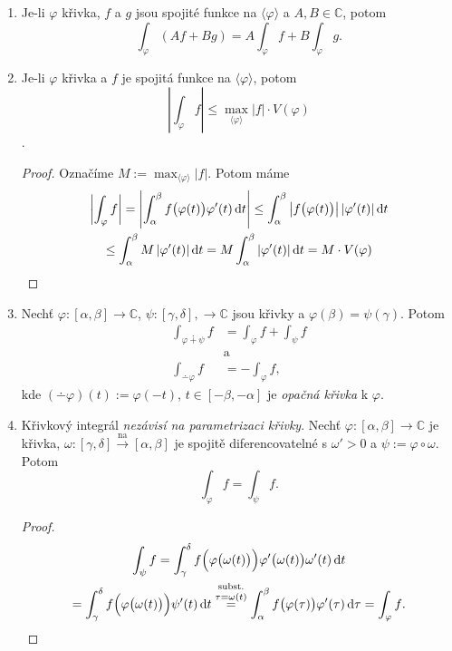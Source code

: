 \begin{propertiesBasic}
\mbox{}
\vspace{-2em}
\begin{enumerate}
    \item Je-li $\varphi$ křivka, $f$ a $g$ jsou spojité funkce na $\langle\varphi\rangle$ a $A,B \in \mathbb{C}$, potom $$\int_\varphi (Af+Bg)=A\int_\varphi f+B\int_\varphi g.$$
    \item Je-li $\varphi$ křivka a $f$ je spojitá funkce na $\langle\varphi\rangle$, potom $$\left|\int_\varphi f\right|\leq\max_{\langle\varphi\rangle}|f|\cdot V(\varphi)$$.
    \begin{proof}
     Označíme $M:=\max_{\langle\varphi\rangle}|f|$. Potom máme
     \begin{multline*}
     \left|\int_\varphi f\right|=
     \left| \int_\alpha^\beta f\bigl(\varphi(t)\bigr) \varphi'(t) \mathop{}\!\mathrm{d} t \right|
     \leq\int_\alpha^\beta\left|f\bigl(\varphi(t)\bigr)\right|\left|\varphi'(t)\right|\mathop{}\!\mathrm{d} t\\
     \leq\int_\alpha^\beta M\left|\varphi'(t)\right|\mathop{}\!\mathrm{d} t =M\int_\alpha^\beta \left|\varphi'(t)\right|\mathop{}\!\mathrm{d} t
     = M\cdot V(\varphi)
     \end{multline*}
    \end{proof}
    \item Nechť %
    $\varphi:[\alpha,\beta]\rightarrow\mathbb{C}$, $\psi:[\gamma,\delta],\rightarrow\mathbb{C}$ jsou křivky a $\varphi(\beta)=\psi(\gamma)$. Potom 
    \begin{align*}
        \int_{\varphi\dotplus\psi}f&=\int_\varphi f+\int_\psi f \\ 
        &\text{a} \\
        \int_{\dotminus \varphi}f&=-\int_\varphi f\text{,}
    \end{align*}
    kde $(\dotminus \varphi)(t):=\varphi(-t)$, $t\in[-\beta,-\alpha]$ je \emph{opačná křivka} k %
    $\varphi$.
    \item Křivkový integrál \emph{nezávisí na parametrizaci křivky}. Nechť $\varphi:[\alpha,\beta]\rightarrow\mathbb{C}$ je křivka, $\omega:[\gamma,\delta]\xrightarrow{\text{na}}[\alpha,\beta]$ je spojitě diferencovatelné s $\omega'>0$ a $\psi:=\varphi\circ\omega$. %
    Potom $$\int_\varphi f = \int_\psi f\text{.}$$
    \begin{proof}
    \begin{multline*}
        \int_\psi f=
    \int_\gamma^\delta f\Bigl(\varphi\bigl(\omega(t)\bigr)\Bigr) \varphi'\bigl(\omega(t)\bigr)\omega'(t)\mathop{}\!\mathrm{d} t\\
    =\int_\gamma^\delta f\Bigl(\varphi\bigl(\omega(t)\bigr)\Bigr)\psi'(t)\mathop{}\!\mathrm{d} t \stackrel{\text{subst.}}{\stackrel{\tau=\omega(t)}{=}}
    \int_\alpha^\beta f\bigl(\varphi(\tau)\bigr) \varphi'(\tau)\mathop{}\!\mathrm{d} \tau=\int_\varphi f \text{.} 
    \end{multline*}
    \end{proof}
\end{enumerate}
\end{propertiesBasic}
